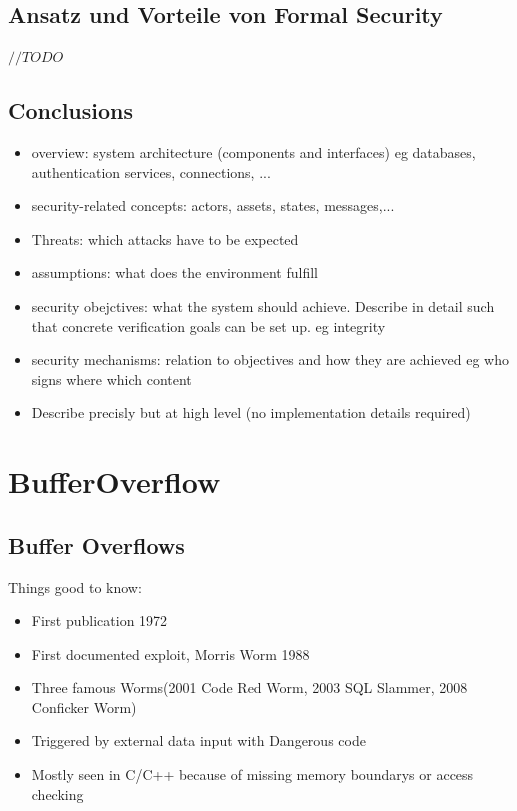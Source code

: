 \documentclass[a4paper, 12pt]{article}
\begin{document}
\subsection{Ansatz und Vorteile von Formal Security}
$ //TODO $
\subsection{Conclusions}
\begin{itemize}
\item overview: system architecture (components and interfaces) eg databases, authentication services, connections, ...
\item security-related concepts: actors, assets, states, messages,...
\item Threats: which attacks have to be expected
\item assumptions: what does the environment fulfill
\item security obejctives: what the system should achieve. Describe in detail such that concrete verification goals can be set up. eg integrity
\item security mechanisms: relation to objectives and how they are achieved eg who signs where which content
\item Describe precisly but at high level (no implementation details required)
\end{itemize}

\section{BufferOverflow}
\subsection{Buffer Overflows}
Things good to know:
\begin{itemize}
\item First publication 1972
\item First documented exploit, Morris Worm 1988
\item Three famous Worms(2001 Code Red Worm, 2003 SQL Slammer, 2008 Conficker Worm)
\item Triggered by external data input with Dangerous code
\item Mostly seen in C/C++ because of missing memory boundarys or access checking
\end{itemize}
\end{document}
